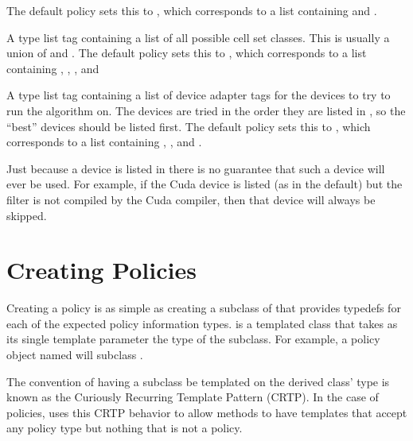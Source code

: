 \begin{description}
  The default policy sets this to , which corresponds to a list containing  and .
\item[\textcode{AllCellSetList}] 
  A type list tag containing a list of all possible cell set classes.
  This is usually a union of  and .
  The default policy sets this to , which corresponds to a list containing , , , and 
\item[\textcode{DeviceAdapterList}] 
  A type list tag containing a list of device adapter tags for the devices to try to run the algorithm on.
  The devices are tried in the order they are listed in , so the ``best'' devices should be listed first.
  The default policy sets this to , which corresponds to a list containing , , and .
\end{description}

\begin{commonerrors}
  Just because a device is listed in  there is no guarantee that such a device will ever be used.
  For example, if the Cuda device is listed (as in the default) but the filter is not compiled by the Cuda compiler, then that device will always be skipped.
\end{commonerrors}


\section{Creating Policies}


Creating a policy is as simple as creating a subclass of  that provides typedefs for each of the expected policy information types.
 is a templated class that takes as its single template parameter the type of the subclass.
For example, a policy object named  will subclass .

\begin{didyouknow}
  The convention of having a subclass be templated on the derived class' type is known as the Curiously Recurring Template Pattern (CRTP).
  In the case of policies, \VTKm uses this CRTP behavior to allow methods to have templates that accept any policy type but nothing that is not a policy.
\end{didyouknow}

